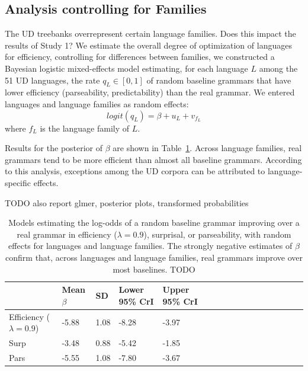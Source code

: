 \documentclass[10pt,twoside,lineno]{article}
\begin{document}
\subsection{Analysis controlling for Families}

The UD treebanks overrepresent certain language families.
Does this impact the results of Study 1?
We estimate the overall degree of optimization of languages for efficiency, controlling for differences between families, we constructed a Bayesian logistic mixed-effects model estimating, for each language $L$ among the 51 UD languages, the rate $q_L \in [0,1]$ of random baseline grammars that have lower efficiency (parseability, predictability) than the real grammar.
We entered languages and language families as random effects:
\begin{equation}\label{eq:mixed-effects-study1}
logit(q_{L}) = \beta + u_{L} + v_{f_L}
\end{equation}
where $f_L$ is the language family of $L$.

Results for the posterior of $\beta$ are shown in Table~\ref{tab:study1-glmer}.
Across language families, real grammars tend to be more efficient than almost all baseline grammars.
According to this analysis, exceptions among the UD corpora can be attributed to language-specific effects.

TODO also report glmer, posterior plots, transformed probabilities

\begin{table}
\small{
\begin{center}
\begin{tabular}{|l||l|lll|llll|ll|llllll}
\hline
	& Mean $\beta$ & SD & Lower 95\% CrI & Upper 95\% CrI \\
\hline\hline
	Efficiency ($\lambda=0.9$) &	-5.88   &   1.08  &  -8.28  &  -3.97  \\
	Surp & -3.48   &   0.88  &  -5.42  &  -1.85   \\
	Pars & -5.55   &   1.08  &  -7.80  &  -3.67    \\
\hline
\end{tabular}
\end{center}
}
	\caption{Models estimating the log-odds of a random baseline grammar improving over a real grammar in efficiency ($\lambda=0.9$), surprisal, or parseability, with random effects for languages and language families. The strongly negative estimates of $\beta$ confirm that, across languages and language families, real grammars improve over most baselines. TODO}\label{tab:study1-glmer}
\end{table}
\end{document}

